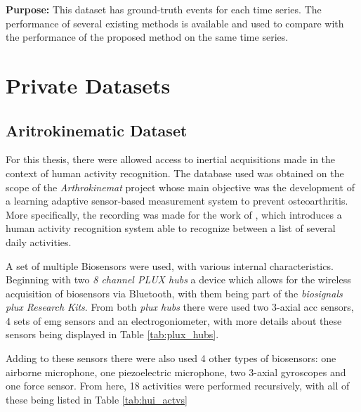 \textbf{Purpose:} This dataset has ground-truth events for each time series. The performance of several existing methods is available and used to compare with the performance of the proposed method on the same time series.

\section{Private Datasets}

\subsection{Aritrokinematic Dataset}

For this thesis, there were allowed access to inertial acquisitions made in the context of human activity recognition. The database used was obtained on the scope of the \textit{Arthrokinemat} project whose main objective was the development of a learning adaptive sensor-based measurement system to prevent osteoarthritis\cite{arthrokinemat}. More specifically, the recording was made for the work of \cite{Liu2019}, which introduces a human activity recognition system able to recognize between a list of several daily activities.

A set of multiple Biosensors were used, with various internal characteristics. Beginning with two \textit{8 channel PLUX hubs} a device which allows for the wireless acquisition of biosensors via Bluetooth, with them being part of the \textit{biosignals plux Research Kits}. From both \textit{plux hubs} there were used two 3-axial \gls{acc} sensors, 4 sets of \gls{emg} sensors and an electrogoniometer, with more details about these sensors being displayed in Table \ref{tab:plux_hubs}.

Adding to these sensors there were also used 4 other types of biosensors: one airborne microphone, one piezoelectric microphone, two 3-axial gyroscopes and one force sensor. From here, 18 activities were performed recursively, with all of these being listed in Table \ref{tab:hui_actvs}


